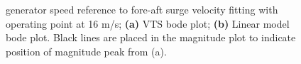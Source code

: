 \begin{figure}[ht]
	\centering
	
	\hfil
	
	\caption{generator speed reference to fore-aft surge velocity fitting with operating point at 16 m/s; \textbf{(a)} VTS bode plot; \textbf{(b)} Linear model bode plot. Black lines are placed in the magnitude plot to indicate position of magnitude peak from (a).}
	\label{fig:app_wref-vy_16}
\end{figure}


